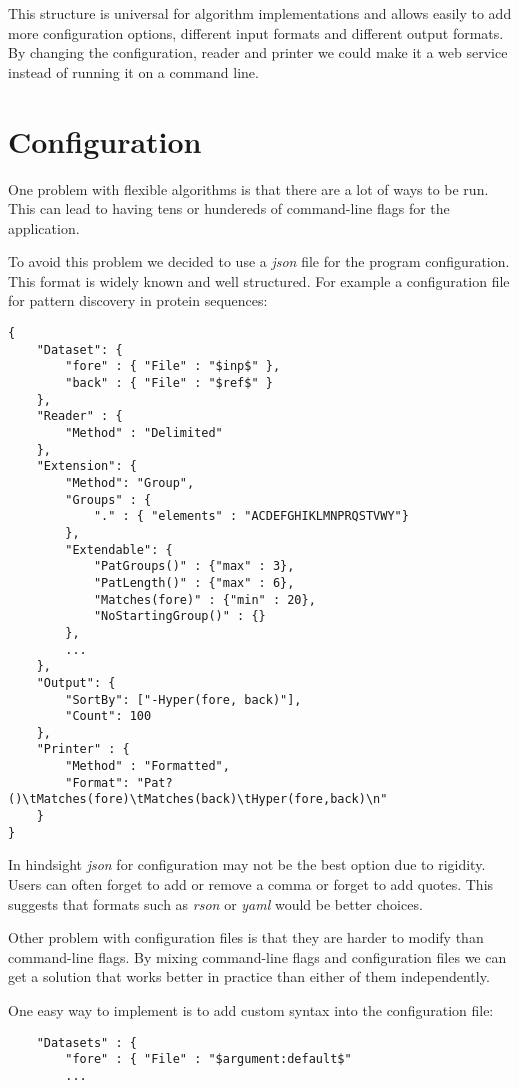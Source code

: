 This structure is universal for algorithm implementations and allows easily to add more configuration options, different input formats and different output formats. By changing the configuration, reader and printer we could make it a web service instead of running it on a command line.

\section{Configuration}

One problem with flexible algorithms is that there are a lot of ways to be run. This can lead to having tens or hundereds of command-line flags for the application.

To avoid this problem we decided to use a \emph{json} file for the program configuration. This format is widely known and well structured. For example a configuration file for pattern discovery in protein sequences:

\begin{lstlisting}
{
    "Dataset": {
        "fore" : { "File" : "$inp$" },
        "back" : { "File" : "$ref$" }
    },
    "Reader" : {
        "Method" : "Delimited"
    },
    "Extension": {
        "Method": "Group",
        "Groups" : {
            "." : { "elements" : "ACDEFGHIKLMNPRQSTVWY"}
        },
        "Extendable": {
            "PatGroups()" : {"max" : 3},
            "PatLength()" : {"max" : 6},
            "Matches(fore)" : {"min" : 20},
            "NoStartingGroup()" : {}
        },
        ...
    },
    "Output": {
        "SortBy": ["-Hyper(fore, back)"],
        "Count": 100
    },
    "Printer" : {
        "Method" : "Formatted",
        "Format": "Pat?()\tMatches(fore)\tMatches(back)\tHyper(fore,back)\n"
    }
}
\end{lstlisting}

In hindsight \emph{json} for configuration may not be the best option due to rigidity. Users can often forget to add or remove a comma or forget to add quotes. This suggests that formats such as \emph{rson} or \emph{yaml} would be better choices.

Other problem with configuration files is that they are harder to modify than command-line flags. By mixing command-line flags and configuration files we can get a solution that works better in practice than either of them independently.

One easy way to implement is to add custom syntax into the configuration file:

\begin{lstlisting}
    "Datasets" : {
        "fore" : { "File" : "$argument:default$"
        ...
\end{lstlisting}

